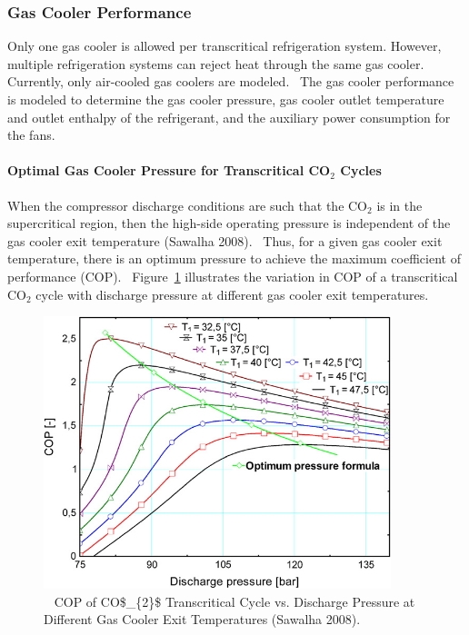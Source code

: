 \subsubsection{Gas Cooler Performance}\label{gas-cooler-performance}

Only one gas cooler is allowed per transcritical refrigeration system. However, multiple refrigeration systems can reject heat through the same gas cooler.~ Currently, only air-cooled gas coolers are modeled.~ The gas cooler performance is modeled to determine the gas cooler pressure, gas cooler outlet temperature and outlet enthalpy of the refrigerant, and the auxiliary power consumption for the fans.

\paragraph{\texorpdfstring{Optimal Gas Cooler Pressure for Transcritical CO\(_{2}\) Cycles}{Optimal Gas Cooler Pressure for Transcritical CO\_\{2\} Cycles}}\label{optimal-gas-cooler-pressure-for-transcritical-coux5f2-cycles}

When the compressor discharge conditions are such that the CO\(_{2}\) is in the supercritical region, then the high-side operating pressure is independent of the gas cooler exit temperature (Sawalha 2008).~ Thus, for a given gas cooler exit temperature, there is an optimum pressure to achieve the maximum coefficient of performance (COP).~ Figure~\ref{fig:cop-of-co_2-transcritical-cycle-vs.-discharge} illustrates the variation in COP of a transcritical CO\(_{2}\) cycle with discharge pressure at different gas cooler exit temperatures.

\begin{figure}[hbtp] %
\centering
\includegraphics[width=0.9\textwidth, height=0.9\textheight, keepaspectratio=true]{media/image6342.png}
\caption{  COP of CO\$\_\{2\}\$ Transcritical Cycle vs. Discharge Pressure at Different Gas Cooler Exit Temperatures (Sawalha 2008). \protect \label{fig:cop-of-co_2-transcritical-cycle-vs.-discharge}}
\end{figure}

